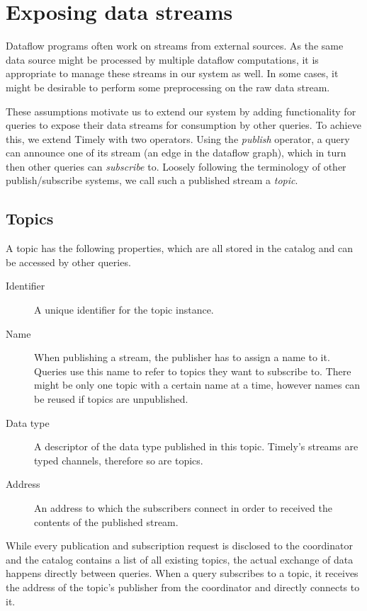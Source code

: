 \section{Exposing data streams}

Dataflow programs often work on streams from external sources. As the same
data source might be processed by multiple dataflow computations, it is
appropriate to manage these streams in our system as well. In some cases, it
might be desirable to perform some preprocessing on the raw data stream.

These assumptions motivate us to extend our system by adding functionality
for queries to expose their data streams for consumption by other queries. To
achieve this, we extend Timely with two operators. Using the \emph{publish}
operator, a query can announce one of its stream (an edge in the dataflow graph),
which in turn then other queries can \emph{subscribe} to.
Loosely following the terminology of other publish/subscribe
systems, we call such a published stream a \emph{topic}.

\subsection{Topics}

A topic has the following properties, which are all stored in the catalog
and can be accessed by other queries.
\begin{description}
\item [Identifier] A unique identifier for the topic instance.
\item [Name] When publishing a stream, the publisher has to assign a name to it.
Queries use this name to refer to topics they want to subscribe to. There might
be only one topic with a certain name at a time, however names can be reused if
topics are unpublished.
\item [Data type] A descriptor of the data type published in this topic. Timely's
streams are typed channels, therefore so are topics.
\item [Address] An address to which the subscribers connect in order to received
the contents of the published stream.
\end{description}

While every publication and subscription request is disclosed to the coordinator
and the catalog contains a list of all existing topics, the
actual exchange of data happens directly between queries. When a query subscribes
to a topic, it receives the address of the topic's publisher from the coordinator
and directly connects to it.

